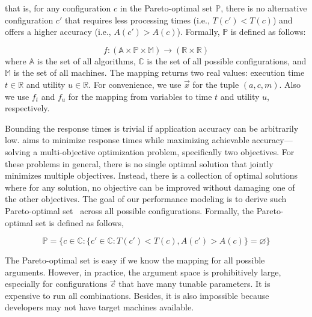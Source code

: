 that is, for any configuration $c$ in the Pareto-optimal set $\mathbb{P}$, there
is no alternative configuration $c'$ that requires less processing times (i.e.,
$T(c') < T(c)$) and offers a higher accuracy (i.e., $A(c') > A(c)$). Formally,
$\mathbb{P}$ is defined as follows:

{\small \vspace{-1em}
  \begin{equation*}
    f: (\mathbb{A} \times \mathbb{P} \times \mathbb{M}) \rightarrow
    (\mathbb{R}\times \mathbb{R})
\end{equation*}
} where $\mathbb{A}$ is the set of all algorithms, $\mathbb{C}$ is the set of
all possible configurations, and $\mathbb{M}$ is the set of all machines. The
mapping returns two real values: execution time $t \in \mathbb{R}$ and utility
$u \in \mathbb{R}$. For convenience, we use $\vec{x}$ for the tuple $(a, c, m)$.
Also we use $f_t$ and $f_u$ for the mapping from variables to time $t$ and
utility $u$, respectively.

Bounding the response times is trivial if application accuracy can be
arbitrarily low. \sysname{} aims to minimize response times while maximizing
achievable accuracy---solving a multi-objective optimization problem,
specifically two objectives. For these problems in general, there is no single
optimal solution that jointly minimizes multiple objectives. Instead, there is a
collection of optimal solutions where for any solution, no objective can be
improved without damaging one of the other objectives. The goal of our
performance modeling is to derive such Pareto-optimal
set~\cite{collette2013multiobjective} across all possible
configurations. Formally, the Pareto-optimal set is defined as follows,

{\small \vspace{-1.2em}
  \begin{equation}
    \mathbb{P} = \{ c \in \mathbb{C} : \{ c' \in \mathbb{C}: T(c') < T(c),
    A(c') > A(c) \} = \varnothing\}
  \label{eq:pareto-2}
\end{equation}
\vspace{-1.2em}
}

 The Pareto-optimal set is easy if we know the mapping for all
possible arguments. However, in practice, the argument space is prohibitively
large, especially for configurations $\vec{c}$ that have many tunable
parameters. It is expensive to run all combinations. Besides, it is also
impossible because developers may not have target machines available.

